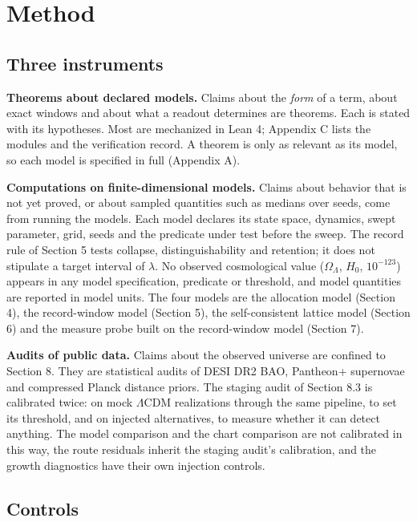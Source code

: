 \hypertarget{method}{%
\section{Method}\label{method}}

\hypertarget{three-instruments}{%
\subsection{Three instruments}\label{three-instruments}}

\textbf{Theorems about declared models.} Claims about the \emph{form} of
a term, about exact windows and about what a readout determines are
theorems. Each is stated with its hypotheses. Most are mechanized in
Lean 4; Appendix C lists the modules and the verification record. A
theorem is only as relevant as its model, so each model is specified in
full (Appendix A).

\textbf{Computations on finite-dimensional models.} Claims about
behavior that is not yet proved, or about sampled quantities such as
medians over seeds, come from running the models. Each model declares
its state space, dynamics, swept parameter, grid, seeds and the
predicate under test before the sweep. The record rule of Section 5
tests collapse, distinguishability and retention; it does not stipulate
a target interval of \(\lambda\). No observed cosmological value
(\(\Omega_\Lambda\), \(H_0\), \(10^{-123}\)) appears in any model
specification, predicate or threshold, and model quantities are reported
in model units. The four models are the allocation model (Section 4),
the record-window model (Section 5), the self-consistent lattice model
(Section 6) and the measure probe built on the record-window model
(Section 7).

\textbf{Audits of public data.} Claims about the observed universe are
confined to Section 8. They are statistical audits of DESI DR2 BAO,
Pantheon+ supernovae and compressed Planck distance priors. The staging
audit of Section 8.3 is calibrated twice: on mock \(\Lambda\)CDM
realizations through the same pipeline, to set its threshold, and on
injected alternatives, to measure whether it can detect anything. The
model comparison and the chart comparison are not calibrated in this
way, the route residuals inherit the staging audit's calibration, and
the growth diagnostics have their own injection controls.

\hypertarget{controls}{%
\subsection{Controls}\label{controls}}

